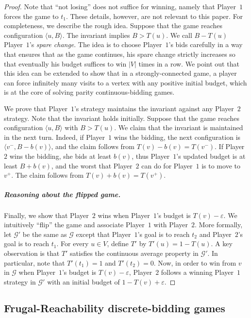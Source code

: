 \documentclass{theoretics}
\newcommand{\PO}{Player~$1$\xspace}
\newcommand{\PT}{Player~$2$\xspace}
\newcommand{\G}{{\mathcal G}}
\newcommand{\zug}[1]{\langle #1  \rangle}
\newcommand{\eps}{\varepsilon}
\begin{document}
\begin{proof}
Note that ``not losing'' does not suffice for winning, namely that \PO forces the game to $t_1$. These details, however, are not relevant to this paper. For completeness, we describe the rough idea. 
Suppose that the game reaches configuration $\zug{u, B}$. The invariant implies $B > T(u)$. We call $B - T(u)$ \PO's {\em spare change}. 
The idea is to choose \PO's bids carefully in a way that ensures that as the game continues, his spare change strictly increases so that eventually his budget suffices to win $|V|$ times in a row. We point out that this idea can be extended to show that in a strongly-connected game, a player can force infinitely many visits to a vertex with any positive initial budget, which is at the core of solving parity continuous-bidding games. 

We prove that \PO's strategy maintains the invariant against any \PT strategy. 
Note that the invariant holds initially. Suppose that the game reaches configuration $\zug{u, B}$ with $B > T(u)$. We claim that the invariant is maintained in the next turn. 
Indeed, if \PO wins the bidding, the next configuration is $\zug{v^-, B - b(v)}$, and the claim follows from $T(v)-b(v) = T(v^-)$. 
If \PT wins the bidding, she bids at least $b(v)$, thus \PO's updated budget is at least $B + b(v)$, and the worst that \PT can do for \PO is to move to $v^+$. The claim follows from $T(v) + b(v) = T(v^+)$. 

\subparagraph*{Reasoning about the flipped game.}
Finally, we show that \PT wins when \PO's budget is $T(v) - \eps$. We intuitively ``flip'' the game and associate \PO with \PT. 
More formally, let $\G'$ be the same as $\G$ except that \PO's goal is to reach $t_2$ and \PT's goal is to reach $t_1$. 
For every $u \in V$, define $T'$ by $T'(u) = 1-T(u)$. A key observation is that $T'$ satisfies the continuous average property in $\G'$. 
In particular, note that $T'(t_1) = 1$ and $T'(t_2) = 0$. 
Now, in order to win from $v$ in $\G$ when \PO's budget is $T(v) - \varepsilon$, \PT follows a winning \PO strategy in $\G'$ with an initial budget of $1-T(v) + \varepsilon$. 
\end{proof}












\subsection{Frugal-Reachability discrete-bidding games}
\end{document}
